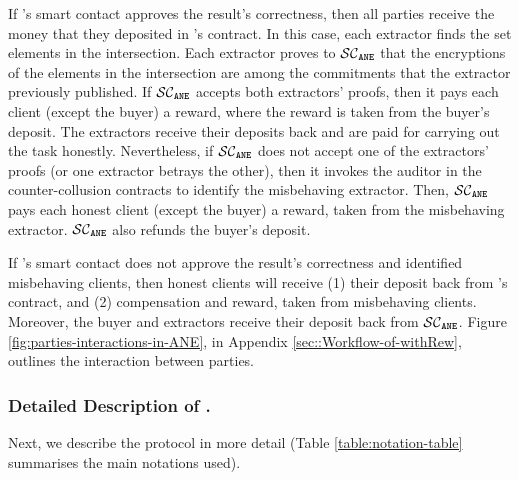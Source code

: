 If  \fpsi's smart contact approves the result's correctness, then all parties receive the money that they deposited in \fpsi's contract. In this case, each extractor finds the set elements in the intersection. Each extractor proves to $\mathcal{SC}_{\mathtt{ANE}}$ that the encryptions of the elements in the intersection are among the commitments that the extractor previously published. 
%
If $\mathcal{SC}_{\mathtt{ANE}}$ accepts both extractors' proofs, then it pays each client (except the buyer) a reward, where the reward is taken from the buyer's deposit. The extractors receive their deposits back and are paid for carrying out the task honestly. Nevertheless, if $\mathcal{SC}_{\mathtt{ANE}}$ does not accept one of the extractors' proofs (or one extractor betrays the other), then it invokes the auditor in the counter-collusion contracts to identify the misbehaving extractor.  Then, $\mathcal{SC}_{\mathtt{ANE}}$ pays each honest client (except the buyer) a reward, taken from the misbehaving extractor. $\mathcal{SC}_{\mathtt{ANE}}$ also refunds the buyer's deposit.
%

If  \fpsi's smart contact does not approve the result's correctness and \aud identified misbehaving clients, then honest clients will receive (1) their deposit back from \fpsi's contract, and (2)  compensation and reward, taken from misbehaving clients. Moreover, the buyer and extractors receive their deposit back from $\mathcal{SC}_{\mathtt{ANE}}$. Figure \ref{fig:parties-interactions-in-ANE}, in Appendix \ref{sec::Workflow-of-withRew}, outlines the interaction between parties. 






\vs



\subsubsection{Detailed Description of \epsi.} Next, we describe the protocol in more detail (Table \ref{table:notation-table} summarises the main notations used). 



